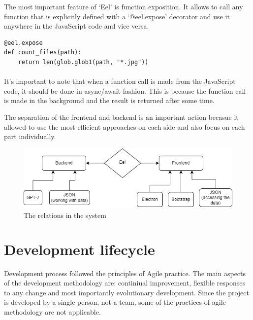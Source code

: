 \documentclass[12pt]{report}
\newenvironment{code}{\captionsetup{type=listing}}{}
\begin{document}
The most important feature of `Eel' is function exposition. It allows to call any function that is explicitly 
defined with a `@eel.expose' decorator and use it anywhere in the JavaScript code and vice versa.

\begin{code}
\begin{verbatim}
@eel.expose
def count_files(path):
    return len(glob.glob1(path, "*.jpg"))
\end{verbatim}
\end{code}

\paragraph*{}
It's important to note that when a function call is made from the JavaScript code, it should be done in
async/await fashion. This is because the function call is made in the background and the result is returned
after some time.

The separation of the frontend and backend is an important action becasue it allowed to use the most efficient
approaches on each side and also focus on each part individually.

\begin{figure}[ht]
  \centering
  \includegraphics[width=1\linewidth]{img/system_diagram.png}
  \caption{The relations in the system}
  \label{fig:system_diagram}
\end{figure}

\clearpage

\section*{Development lifecycle}
\paragraph{}
Development process followed the principles of Agile practice. The main aspects of the development methodology
are: continiual improvement, flexible responses to any change and most importantly evolutionary development. Since
the project is developed by a single person, not a team, some of the practices of agile methodology are not applicable.
\end{document}

